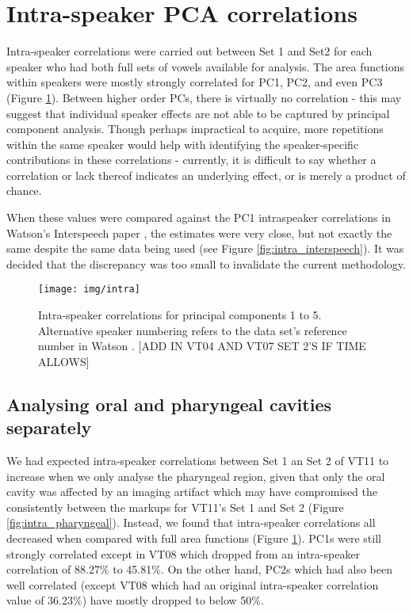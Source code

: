 \section{Intra-speaker PCA correlations}\label{sec:results-intra}

Intra-speaker correlations were carried out between Set 1 and Set2 for each speaker who had both full sets of vowels available for analysis. The area functions within speakers were mostly strongly correlated for PC1, PC2, and even PC3 (Figure \ref{fig:intra}). Between higher order PCs, there is virtually no correlation - this may suggest that individual speaker effects are not able to be captured by principal component analysis. Though perhaps impractical to acquire, more repetitions within the same speaker would help with identifying the speaker-specific contributions in these correlations - currently, it is difficult to say whether a correlation or lack thereof indicates an underlying effect, or is merely a product of chance.

When these values were compared against the PC1 intraspeaker correlations in Watson's Interspeech paper \cite{watson2014mappings}, the estimates were very close, but not exactly the same despite the same data being used (see Figure \ref{fig:intra_interspeech}). It was decided that the discrepancy was too small to invalidate the current methodology.

\begin{figure}[H]
    \centering
    \texttt{[image: img/intra]}
    \caption{Intra-speaker correlations for principal components 1 to 5. Alternative speaker numbering refers to the data set's reference number in Watson \cite{watson2014mappings}. [ADD IN VT04 AND VT07 SET 2'S IF TIME ALLOWS]}
    \label{fig:intra}
\end{figure}

\subsection{Analysing oral and pharyngeal cavities separately}

We had expected intra-speaker correlations between Set 1 an Set 2 of VT11 to increase when we only analyse the pharyngeal region, given that only the oral cavity was affected by an imaging artifact which may have compromised the consistently between the markups for VT11's Set 1 and Set 2 (Figure \ref{fig:intra_pharyngeal}). Instead, we found that intra-speaker correlations all decreased when compared with full area functions (Figure \ref{fig:intra}). PC1s were still strongly correlated except in VT08 which dropped from an intra-speaker correlation of 88.27\% to 45.81\%. On the other hand, PC2s which had also been well correlated (except VT08 which had an original intra-speaker correlation value of 36.23\%) have mostly dropped to below 50\%. 

